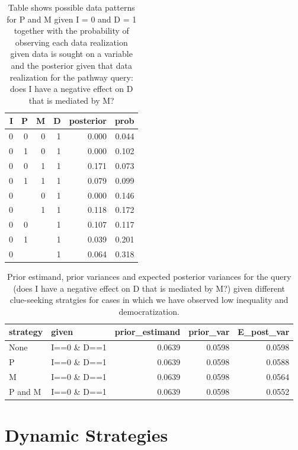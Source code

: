 \documentclass[
  12pt,
]{book}
\begin{document}
\begin{table}

\caption{\label{tab:pimdout}Table shows possible data patterns for P and M given I = 0 and D = 1 together with the probability of observing each data realization given data is sought on a variable and the posterior given that data realization for the pathway query: does I have a negative effect on D that is mediated by M?}
\centering
\begin{tabular}[t]{r|r|r|r|r|r}
\hline
I & P & M & D & posterior & prob\\
\hline
0 & 0 & 0 & 1 & 0.000 & 0.044\\
\hline
0 & 1 & 0 & 1 & 0.000 & 0.102\\
\hline
0 & 0 & 1 & 1 & 0.171 & 0.073\\
\hline
0 & 1 & 1 & 1 & 0.079 & 0.099\\
\hline
0 &  & 0 & 1 & 0.000 & 0.146\\
\hline
0 &  & 1 & 1 & 0.118 & 0.172\\
\hline
0 & 0 &  & 1 & 0.107 & 0.117\\
\hline
0 & 1 &  & 1 & 0.039 & 0.201\\
\hline
0 &  &  & 1 & 0.064 & 0.318\\
\hline
\end{tabular}
\end{table}

\begin{table}

\caption{\label{tab:pimdlearnpath}Prior estimand, prior variances and expected posterior variances for the query (does I have a negative effect on D that is mediated by M?) given different  clue-seeking  stratgies for cases in which we have observed low inequality and democratization.}
\centering
\begin{tabular}[t]{l|l|r|r|r}
\hline
strategy & given & prior\_estimand & prior\_var & E\_post\_var\\
\hline
None & I==0 \& D==1 & 0.0639 & 0.0598 & 0.0598\\
\hline
P & I==0 \& D==1 & 0.0639 & 0.0598 & 0.0588\\
\hline
M & I==0 \& D==1 & 0.0639 & 0.0598 & 0.0564\\
\hline
P and M & I==0 \& D==1 & 0.0639 & 0.0598 & 0.0552\\
\hline
\end{tabular}
\end{table}

\hypertarget{dynamic-strategies}{%
\section{Dynamic Strategies}\label{dynamic-strategies}}
\end{document}
